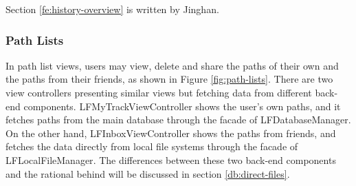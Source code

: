 \documentclass[12pt,a4paper]{article}
\renewcommand\texttt[1]{{\ttfamily\color{textttColor}#1}}
\begin{document}
            \footnotesize
            Section \ref{fe:history-overview} is written by Jinghan.
            \normalsize
            
            
            \subsubsection{Path Lists} %
            \label{fe:path-lists}
            
            In path list views, users may view, delete and share the paths of their own and the paths from their friends, as shown in Figure \ref{fig:path-lists}. There are two view controllers presenting similar views but fetching data from different back-end components. \texttt{LFMyTrackViewController} shows the user's own paths, and it fetches paths from the main database through the facade of \texttt{LFDatabaseManager}. On the other hand, \texttt{LFInboxViewController} shows the paths from friends, and fetches the data directly from local file systems through the facade of \texttt{LFLocalFileManager}. The differences between these two back-end components and the rational behind will be discussed in section \ref{db:direct-files}.
            
\end{document}
